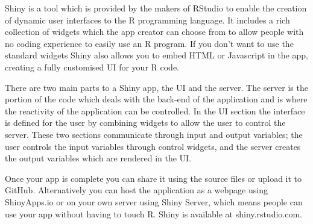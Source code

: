 Shiny is a tool which is provided by the makers of RStudio to enable the creation of dynamic user interfaces to the R programming language.  It includes a rich collection of widgets which the app creator can choose from to allow people with no coding experience to easily use an R program.  If you don’t want to use the standard widgets Shiny also allows you to embed HTML or Javascript in the app, creating a fully customised UI for your R code.
 
There are two main parts to a Shiny app, the UI and the server.  The server is the portion of the code which deals with the back-end of the application and is where the reactivity of the application can be controlled.  In the UI section the interface is defined for the user by combining widgets to allow the user to control the server.  These two sections communicate through input and output variables; the user controls the input variables through control widgets, and the server creates the output variables which are rendered in the UI.
 
Once your app is complete you can share it using the source files or upload it to GitHub.  Alternatively you can host the application as a webpage using ShinyApps.io or on your own server using Shiny Server, which means people can use your app without having to touch R.  Shiny is available at shiny.rstudio.com.
